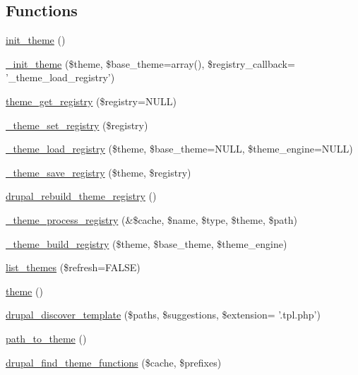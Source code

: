 \subsection*{Functions}
\begin{CompactItemize}
\item 
\hyperlink{includes_2theme_8inc_35160721f9c84c9a8f0825db6e7445d1}{init\_\-theme} ()
\item 
\hyperlink{includes_2theme_8inc_4311bff320dfcb10890b3892a163d711}{\_\-init\_\-theme} (\$theme, \$base\_\-theme=array(), \$registry\_\-callback= '\_\-theme\_\-load\_\-registry')
\item 
\hyperlink{includes_2theme_8inc_d28a6d2c5a667d0d6ae7634329d1aa92}{theme\_\-get\_\-registry} (\$registry=NULL)
\item 
\hyperlink{includes_2theme_8inc_5e6d3b110d90576d51bb23e1c080a1c1}{\_\-theme\_\-set\_\-registry} (\$registry)
\item 
\hyperlink{includes_2theme_8inc_176cb2c73e314b8a457504aade287eaf}{\_\-theme\_\-load\_\-registry} (\$theme, \$base\_\-theme=NULL, \$theme\_\-engine=NULL)
\item 
\hyperlink{includes_2theme_8inc_a74b1ecea2de39ca0413a1a661167d39}{\_\-theme\_\-save\_\-registry} (\$theme, \$registry)
\item 
\hyperlink{includes_2theme_8inc_46976f4dc489ea1376b8f623b270daa3}{drupal\_\-rebuild\_\-theme\_\-registry} ()
\item 
\hyperlink{includes_2theme_8inc_473fae348447b091f0d8e677820d30c3}{\_\-theme\_\-process\_\-registry} (\&\$cache, \$name, \$type, \$theme, \$path)
\item 
\hyperlink{includes_2theme_8inc_4a1f9a033ff57b119d18697763909f3d}{\_\-theme\_\-build\_\-registry} (\$theme, \$base\_\-theme, \$theme\_\-engine)
\item 
\hyperlink{includes_2theme_8inc_48d5521b10139d745626435d804353a4}{list\_\-themes} (\$refresh=FALSE)
\item 
\hyperlink{includes_2theme_8inc_0512a0a56fd1e056cb48bcb694fa8b12}{theme} ()
\item 
\hyperlink{includes_2theme_8inc_37b72ed30fd7ebc02fad346580eef2c4}{drupal\_\-discover\_\-template} (\$paths, \$suggestions, \$extension= '.tpl.php')
\item 
\hyperlink{includes_2theme_8inc_8fd73902b4d3a2d476e5b1324506b5e1}{path\_\-to\_\-theme} ()
\item 
\hyperlink{includes_2theme_8inc_38b3ec5ba23e776b29f3f907a75711f1}{drupal\_\-find\_\-theme\_\-functions} (\$cache, \$prefixes)
\item 

\end{CompactItemize}
